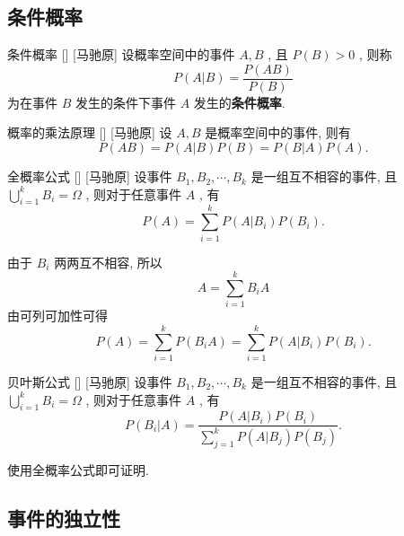 \documentclass[UTF8]{ctexart}
\begin{document}
        \begin{prf}
            
        \end{prf}

    \subsection{条件概率}

        \begin{dfn}
            []
            {条件概率}
            []
            [马驰原]
            设概率空间中的事件 \(A,B\) , 且 \(P(B)>0\) , 则称\[P(A|B)=\frac{P(AB)}{P(B)}\]为在事件 \(B\) 发生的条件下事件 \(A\) 发生的\textbf{条件概率}. 
        \end{dfn}

        \begin{ppt}
            []
            {概率的乘法原理}
            []
            [马驰原]
            设 \(A,B\) 是概率空间中的事件, 则有\[P(AB)=P(A|B)P(B)=P(B|A)P(A).\]
        \end{ppt}

        \begin{thm}
            []
            {全概率公式}
            []
            [马驰原]
            设事件  \(B_1,B_2,\cdots,B_k\)  是一组互不相容的事件, 且  \(\bigcup_{i=1}^{k}B_i=\Omega\) , 则对于任意事件  \(A\) , 有
            \[P(A)=\sum_{i=1}^{k}P(A|B_i)P(B_i).\]
        \end{thm}

        \begin{prf}
            由于 \(B_i\) 两两互不相容, 所以\[A=\sum_{i=1}^{k}B_iA\]
            由可列可加性可得\[P(A)=\sum_{i=1}^{k}P(B_iA)=\sum_{i=1}^{k}P(A|B_i)P(B_i).\]
        \end{prf}

        \begin{thm}
            []
            {贝叶斯公式}
            []
            [马驰原]
            设事件 \(B_1,B_2,\cdots,B_k\) 是一组互不相容的事件, 且 \(\bigcup_{i=1}^{k}B_i=\Omega\) , 则对于任意事件 \(A\) , 有\[P(B_i|A)=\frac{P(A|B_i)P(B_i)}{\sum_{j=1}^{k}P(A|B_j)P(B_j)}.\]
        \end{thm}

        \begin{prf}
            使用全概率公式即可证明. 
        \end{prf}

    \subsection{事件的独立性}
\end{document}
